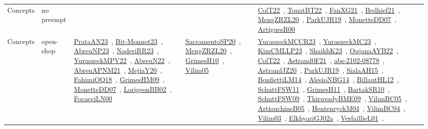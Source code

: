 {\begin{longtable}{lp{3cm}>{\raggedright\arraybackslash}p{6cm}>{\raggedright\arraybackslash}p{6cm}>{\raggedright\arraybackslash}p{8cm}}
Concepts & no preempt &  &  & \href{works/ColT22.pdf}{ColT22}~\cite{ColT22}, \href{works/TouatBT22.pdf}{TouatBT22}~\cite{TouatBT22}, \href{works/FanXG21.pdf}{FanXG21}~\cite{FanXG21}, \href{works/Bedhief21.pdf}{Bedhief21}~\cite{Bedhief21}, \href{works/MengZRZL20.pdf}{MengZRZL20}~\cite{MengZRZL20}, \href{works/ParkUJR19.pdf}{ParkUJR19}~\cite{ParkUJR19}, \href{works/MonetteDD07.pdf}{MonetteDD07}~\cite{MonetteDD07}, \href{works/ArtiguesR00.pdf}{ArtiguesR00}~\cite{ArtiguesR00}\\
Concepts & open-shop & \href{works/PrataAN23.pdf}{PrataAN23}~\cite{PrataAN23}, \href{works/Bit-Monnot23.pdf}{Bit-Monnot23}~\cite{Bit-Monnot23}, \href{works/AbreuNP23.pdf}{AbreuNP23}~\cite{AbreuNP23}, \href{works/NaderiRR23.pdf}{NaderiRR23}~\cite{NaderiRR23}, \href{works/YuraszeckMPV22.pdf}{YuraszeckMPV22}~\cite{YuraszeckMPV22}, \href{works/AbreuN22.pdf}{AbreuN22}~\cite{AbreuN22}, \href{works/AbreuAPNM21.pdf}{AbreuAPNM21}~\cite{AbreuAPNM21}, \href{works/MejiaY20.pdf}{MejiaY20}~\cite{MejiaY20}, \href{works/FahimiOQ18.pdf}{FahimiOQ18}~\cite{FahimiOQ18}, \href{works/GrimesHM09.pdf}{GrimesHM09}~\cite{GrimesHM09}, \href{works/MonetteDD07.pdf}{MonetteDD07}~\cite{MonetteDD07}, \href{works/LorigeonBB02.pdf}{LorigeonBB02}~\cite{LorigeonBB02}, \href{works/FocacciLN00.pdf}{FocacciLN00}~\cite{FocacciLN00} & \href{works/SacramentoSP20.pdf}{SacramentoSP20}~\cite{SacramentoSP20}, \href{works/MengZRZL20.pdf}{MengZRZL20}~\cite{MengZRZL20}, \href{works/GrimesH10.pdf}{GrimesH10}~\cite{GrimesH10}, \href{works/Vilim05.pdf}{Vilim05}~\cite{Vilim05} & \href{works/YuraszeckMCCR23.pdf}{YuraszeckMCCR23}~\cite{YuraszeckMCCR23}, \href{works/YuraszeckMC23.pdf}{YuraszeckMC23}~\cite{YuraszeckMC23}, \href{works/KimCMLLP23.pdf}{KimCMLLP23}~\cite{KimCMLLP23}, \href{works/ShaikhK23.pdf}{ShaikhK23}~\cite{ShaikhK23}, \href{works/OujanaAYB22.pdf}{OujanaAYB22}~\cite{OujanaAYB22}, \href{works/ColT22.pdf}{ColT22}~\cite{ColT22}, \href{works/Astrand0F21.pdf}{Astrand0F21}~\cite{Astrand0F21}, \href{works/abs-2102-08778.pdf}{abs-2102-08778}~\cite{abs-2102-08778}, \href{works/AstrandJZ20.pdf}{AstrandJZ20}~\cite{AstrandJZ20}, \href{works/ParkUJR19.pdf}{ParkUJR19}~\cite{ParkUJR19}, \href{works/SialaAH15.pdf}{SialaAH15}~\cite{SialaAH15}, \href{works/BonfiettiLM14.pdf}{BonfiettiLM14}~\cite{BonfiettiLM14}, \href{works/AlesioNBG14.pdf}{AlesioNBG14}~\cite{AlesioNBG14}, \href{works/BillautHL12.pdf}{BillautHL12}~\cite{BillautHL12}, \href{works/SchuttFSW11.pdf}{SchuttFSW11}~\cite{SchuttFSW11}, \href{works/GrimesH11.pdf}{GrimesH11}~\cite{GrimesH11}, \href{works/BartakSR10.pdf}{BartakSR10}~\cite{BartakSR10}, \href{works/SchuttFSW09.pdf}{SchuttFSW09}~\cite{SchuttFSW09}, \href{works/ThiruvadyBME09.pdf}{ThiruvadyBME09}~\cite{ThiruvadyBME09}, \href{works/VilimBC05.pdf}{VilimBC05}~\cite{VilimBC05}, \href{works/ArtiouchineB05.pdf}{ArtiouchineB05}~\cite{ArtiouchineB05}, \href{works/HentenryckM04.pdf}{HentenryckM04}~\cite{HentenryckM04}, \href{works/VilimBC04.pdf}{VilimBC04}~\cite{VilimBC04}, \href{works/Vilim03.pdf}{Vilim03}~\cite{Vilim03}, \href{works/ElkhyariGJ02a.pdf}{ElkhyariGJ02a}~\cite{ElkhyariGJ02a}, \href{works/VerfaillieL01.pdf}{VerfaillieL01}~\cite{VerfaillieL01}, 
\end{longtable}}
